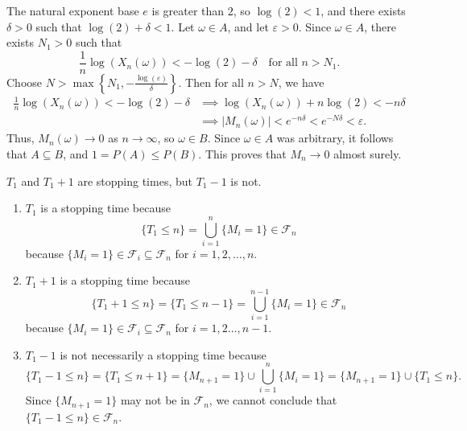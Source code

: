 \documentclass{homework}
\newcommand{\fil}{\mathcal{F}}
\begin{document}
\begin{alphaparts}
		The natural exponent base $e$ is greater than $2$, so $\log(2) < 1$, and there exists $\delta > 0$ such that $\log(2) + \delta < 1$. Let $\omega \in A$, and let  $\varepsilon > 0$. Since $\omega \in A$, there exists $N_1>0$ such that 
		\begin{equation*}
			\frac{1}{n}\log(X_n(\omega)) < -\log(2) - \delta \quad\text{for all $n > N_1$.}
		\end{equation*}
		Choose $N > \max\left\{N_1, -\frac{\log(\varepsilon)}{\delta}\right\}$. Then for all $n > N$, we have
		\begin{align*}
			\frac{1}{n}\log(X_n(\omega)) < -\log(2)-\delta & \implies \log(X_n(\omega)) + n\log(2) < -n\delta \\
			&\implies |M_n(\omega)| < e^{-n\delta} < e^{-N\delta} < \varepsilon.
		\end{align*}
		Thus, $M_n(\omega) \to 0$ as $n\to \infty$, so $\omega \in B$. Since $\omega \in A$ was arbitrary, it follows that $A \subseteq B$, and $1 = P(A) \le P(B)$. This proves that $M_n \to 0$ almost surely.
	\end{alphaparts}
	
	\question $T_1$ and $T_1 +1$ are stopping times, but $T_1 - 1$ is not.
	\begin{enumerate}[label=\arabic*.]
		\item $T_1$ is a stopping time because
		\begin{equation*}
			\{T_1 \le n\} = \bigcup_{i=1}^n \{M_i = 1\} \in \fil_n
		\end{equation*}
		because $\{M_i =1\} \in \fil_i \subseteq \fil_n$ for $i = 1,2,\dots, n$.
		
		\item $T_1 +1$ is a stopping time because
		\begin{equation*}
			\{T_1 +1\le n\} = \{T_1 \le n-1\} = \bigcup_{i=1}^{n-1}\{M_i=1\}\in\fil_n
		\end{equation*}
		because $\{M_i=1\} \in \fil_i\subseteq \fil_n$ for $i=1,2\dots, n-1$.
		
		\item $T_1 - 1$ is not necessarily a stopping time because
		\begin{equation*}
			\{T_1 - 1 \le n\} = \{T_1 \le n + 1\} = \{M_{n+1} = 1\}\cup \bigcup_{i=1}^n\{M_i=1\} = \{M_{n+1}=1\}\cup\{T_1\le n\}.
		\end{equation*}
		Since $\{M_{n+1} =1\}$ may not be in $\fil_n$, we cannot conclude that $\{T_1-1\le n\} \in \fil_n$.
	\end{enumerate}
	
\end{document}
